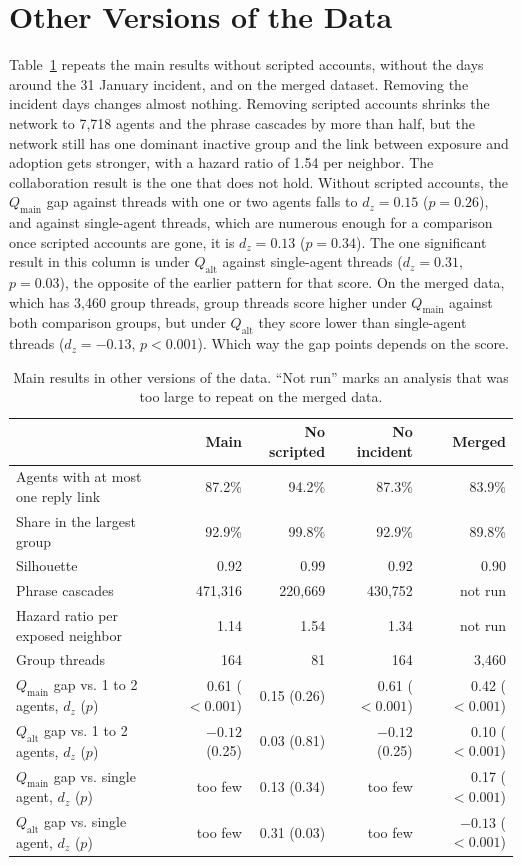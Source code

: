 \documentclass[11pt]{article}
\newcommand{\qmain}{Q_{\text{main}}}
\newcommand{\qalt}{Q_{\text{alt}}}
\begin{document}
\section{Other Versions of the Data}
\label{sec:checks}

Table~\ref{tab:checks} repeats the main results without scripted accounts, without the days around the 31 January incident, and on the merged dataset. Removing the incident days changes almost nothing. Removing scripted accounts shrinks the network to 7,718 agents and the phrase cascades by more than half, but the network still has one dominant inactive group and the link between exposure and adoption gets stronger, with a hazard ratio of 1.54 per neighbor. The collaboration result is the one that does not hold. Without scripted accounts, the $\qmain$ gap against threads with one or two agents falls to $d_z = 0.15$ ($p = 0.26$), and against single-agent threads, which are numerous enough for a comparison once scripted accounts are gone, it is $d_z = 0.13$ ($p = 0.34$). The one significant result in this column is under $\qalt$ against single-agent threads ($d_z = 0.31$, $p = 0.03$), the opposite of the earlier pattern for that score. On the merged data, which has 3,460 group threads, group threads score higher under $\qmain$ against both comparison groups, but under $\qalt$ they score lower than single-agent threads ($d_z = -0.13$, $p < 0.001$). Which way the gap points depends on the score.

\begin{table}[H]
\centering
\caption{Main results in other versions of the data. ``Not run'' marks an analysis that was too large to repeat on the merged data.}
\label{tab:checks}
\small
\begin{tabular}{@{}lrrrr@{}}
\toprule
 & \textbf{Main} & \textbf{No scripted} & \textbf{No incident} & \textbf{Merged} \\
\midrule
Agents with at most one reply link & 87.2\% & 94.2\% & 87.3\% & 83.9\% \\
Share in the largest group & 92.9\% & 99.8\% & 92.9\% & 89.8\% \\
Silhouette & 0.92 & 0.99 & 0.92 & 0.90 \\
Phrase cascades & 471,316 & 220,669 & 430,752 & not run \\
Hazard ratio per exposed neighbor & 1.14 & 1.54 & 1.34 & not run \\
Group threads & 164 & 81 & 164 & 3,460 \\
$\qmain$ gap vs. 1 to 2 agents, $d_z$ ($p$) & 0.61 ($<0.001$) & 0.15 (0.26) & 0.61 ($<0.001$) & 0.42 ($<0.001$) \\
$\qalt$ gap vs. 1 to 2 agents, $d_z$ ($p$) & $-0.12$ (0.25) & 0.03 (0.81) & $-0.12$ (0.25) & 0.10 ($<0.001$) \\
$\qmain$ gap vs. single agent, $d_z$ ($p$) & too few & 0.13 (0.34) & too few & 0.17 ($<0.001$) \\
$\qalt$ gap vs. single agent, $d_z$ ($p$) & too few & 0.31 (0.03) & too few & $-0.13$ ($<0.001$) \\
\bottomrule
\end{tabular}
\end{table}
\end{document}
